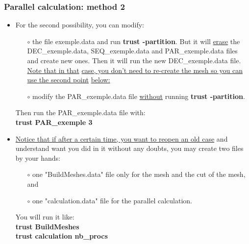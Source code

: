 \documentclass[10pt, hyperref={unicode=true,pdfusetitle, bookmarks=true,bookmarksnumbered=false,bookmarksopen=false, breaklinks=false,pdfborder={0 0 1},backref=true,colorlinks=true,linkcolor=darkblue,pageanchor}]{beamer}
\begin{document}
\begin{frame}
\frametitle{Parallel calculation: method 2}
\begin{block}{}

\begin{itemize}
\item For the second possibility, you can modify:
    \begin{itemize}
    \item [$\circ$] the file exemple.data and run \textbf{trust -partition}. But it will \underline{erase} the DEC\_exemple.data, SEQ\_exemple.data and PAR\_exemple.data files and create new ones. Then it will run the new DEC\_exemple.data file. \underline{Note that in that} \underline{case, you don't need to re-create the mesh so you can use the second point} \underline{below:}
    \item [$\circ$] modify the PAR\_exemple.data file \underline{without} running \textbf{trust -partition}.
    \end{itemize}
Then run the PAR\_exemple.data file with:\\
\textbf{trust PAR\_exemple 3}

\item \underline{Notice that if after a certain time, you want to reopen an old case} and understand want you did in it without any doubts, you may create two files by your hands:
    \begin{itemize} 
    \item [$\circ$] one "BuildMeshes.data" file only for the mesh and the cut of the mesh, and
    \item [$\circ$] one "calculation.data" file for the parallel calculation.
    \end{itemize}
You will run it like:\\
\textbf{trust BuildMeshes}\\
\textbf{trust calculation nb\_procs}\\
\end{itemize}

\end{block}
\end{frame}
\end{document}
